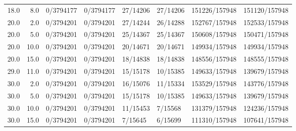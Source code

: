 \begin{tabular}{rrllllll}
18.0 &  8.0 &       0/3794177 &  0/3794177 &    27/14206 &   27/14206 & 151226/157948 & 151120/157948 \\
20.0 &  2.0 &       0/3794201 &  0/3794201 &    27/14244 &   26/14288 & 152767/157948 & 152533/157948 \\
20.0 &  5.0 &       0/3794201 &  0/3794201 &    25/14367 &   25/14367 & 150608/157948 & 150471/157948 \\
20.0 & 10.0 &       0/3794201 &  0/3794201 &    20/14671 &   20/14671 & 149934/157948 & 149934/157948 \\
20.0 & 15.0 &       0/3794201 &  0/3794201 &    18/14838 &   18/14838 & 148556/157948 & 148555/157948 \\
29.0 & 11.0 &       0/3794201 &  0/3794201 &    15/15178 &   10/15385 & 149633/157948 & 139679/157948 \\
30.0 &  2.0 &       0/3794201 &  0/3794201 &    16/15076 &   11/15334 & 153529/157948 & 143776/157948 \\
30.0 &  5.0 &       0/3794201 &  0/3794201 &    15/15178 &   10/15385 & 149633/157948 & 139679/157948 \\
30.0 & 10.0 &       0/3794201 &  0/3794201 &    11/15453 &    7/15568 & 131379/157948 & 124236/157948 \\
30.0 & 15.0 &       0/3794201 &  0/3794201 &     7/15645 &    6/15699 & 111310/157948 & 107641/157948 \\
\bottomrule
\end{tabular}
